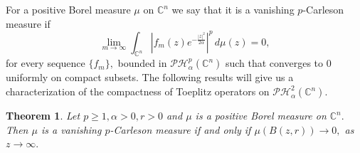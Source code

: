 \documentclass[10pt,leqno]{amsart}
\newtheorem{theorem}{Theorem}[section]
\theoremstyle{remark}
\numberwithin{equation}{section}
\newcommand{\ph}{\mathcal{PH}_\alpha^p(\mathbb{C}^n)}%
\newcommand{\hph}{\mathcal{PH}_\alpha^2(\mathbb{C}^n)}%
\begin{document}
For a positive Borel measure $\mu$ on $\mathbb{C}^{n}$ we say that it is a vanishing $p$-Carleson measure if
\begin{equation}\label{eq:definition-of-a-vanishing-Fock-Carleson-measures}
	\lim_{m \to \infty} \int_{\mathbb{C}^{n}}^{}\left| f_m(z)e^{-\frac{|z|^2}{2\alpha}} \right|^{p} \, d\mu(z) = 0,
\end{equation}
for every sequence $\{f_m\},$ bounded in $\ph$ such that converges to 0 uniformly on compact subsets. The following results will give us a characterization of the compactness of Toeplitz operators on $\hph$.
\begin{theorem}\label{thm:vanishing-Fock-Carleson-measures}
	Let $p\geq 1,\alpha>0,r>0$ and $\mu$ is a positive Borel measure on $\mathbb{C}^{n}.$ Then $\mu$ is a vanishing $p$-Carleson measure if and only if $\mu\left( B(z,r) \right) \to 0,$ as $z \to \infty.$
\end{theorem}
\end{document}
